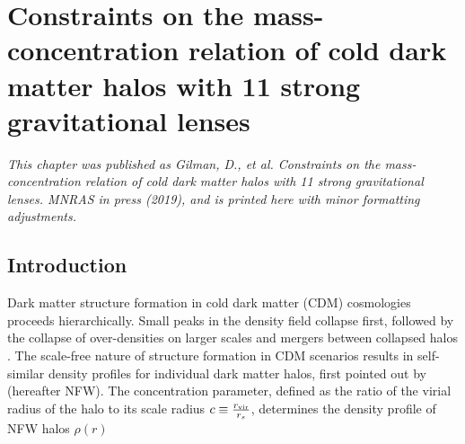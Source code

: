 \def\rein{{$R_{\rm{Ein}}$}}
\def\cmg{{\rm{$\rm{cm}^2 \rm{g}^{-1}$}}}
\def\msun{{M_{\odot}}}
\def\sigmasidm{{$\sigma_{\rm{SIDM}}$}}
\def\dlos{{\delta_{\rm{los}}}}
\def\mhm{{m_{\rm{hm}}}}

\def\sevenonesigma{{$c = 15_{-8}^{+9}$}}
\def\eightonesigma{{$c = 12_{-5}^{+6}$}}
\def\nineonesigma{{$c = 10_{-4}^{+7}$}}

\def\seventwosigma{{$c = 15_{-11}^{+18}$}}
\def\eighttwosigma{{$c = 12_{-9}^{+15}$}}
\def\ninetwosigma{{$c = 10_{-7}^{+14}$}}

\def\data{{\bf{d}_{\rm{n}}}}
\def\datasim{{\bf{d}_{\rm{n}}^{\prime}}}
\def\msub{{\bf{m}_{\rm{sub}}}}
\def\qsub{{\bf{q}_{\rm{s}}}}
\def\fsub{{{f}_{\rm{sub}}}}
\def\fsubmean{{\bar{f}_{\rm{sub}}}}
\def\qmac{{\bf{M}}}
\def\qm{{}{\bf{M}}}
\def\sigmasubmean{0.035 \rm{kpc^{-2}}}
\def\sigmasubonesigma{0.025 < \Sigma_{\rm{sub}} < 0.05 \rm{kpc^{-2}}}
\def\sigmasubtwosigma{0.01 < \Sigma_{\rm{sub}} < 0.075 \rm{kpc^{-2}}}
\def\msubmean{3.9 \times 10^7 \msun \rm{kpc^{-2}}}
\def\msubonesigmalow{2.8 \times 10^7 \msun \rm{kpc^{-2}}}
\def\msubonesigmahigh{5.8 \times 10^7 \msun \rm{kpc^{-2}}}
\def\msubtwosigmalow{1.1 \times 10^7 \msun \rm{kpc^{-2}}}
\def\msubtwosigmalow{8.3 \times 10^7 \msun \rm{kpc^{-2}}}

\chapter{Constraints on the mass-concentration relation of cold dark matter halos with 11 strong gravitational lenses}
\textit{This chapter was published as Gilman, D., et al. Constraints on the mass-concentration relation of cold dark matter halos with 11 strong gravitational lenses. MNRAS in press (2019), and is printed here with minor formatting adjustments.}

\section{Introduction}
Dark matter structure formation in cold dark matter (CDM) cosmologies proceeds hierarchically. Small peaks in the density field collapse first, followed by the collapse of over-densities on larger scales and mergers between collapsed halos \citep{Navarro++97,Moore++99}. The scale-free nature of structure formation in CDM scenarios results in self-similar density profiles for individual dark matter halos, first pointed out by \citet{Navarro++96} (hereafter NFW). The concentration parameter, defined as the ratio of the virial radius of the halo to its scale radius $c \equiv \frac{r_{\rm{vir}}}{r_s}$, determines the density profile of NFW halos $\rho\left(r\right)$

